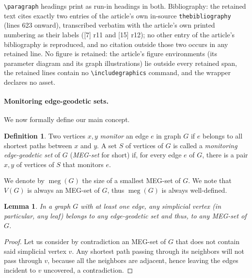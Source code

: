 \documentclass[10pt,a4paper]{amsart}
\theoremstyle{plain}
\newtheorem{lemma}[theorem]{Lemma}
\theoremstyle{definition}
\newtheorem{definition}[theorem]{Definition}
\DeclareMathOperator{\MEG}{meg}
\begin{document}
\texttt{\textbackslash paragraph} headings print as run-in headings in both. Bibliography: the retained text cites exactly two entries of the article's own in-source \texttt{thebibliography} (lines 623 onward), transcribed verbatim with the article's own printed numbering as their labels ([7] r11 and [15] r12); no other entry of the article's bibliography is reproduced, and no citation outside those two occurs in any retained line. No figure is retained: the article's figure environments (its parameter diagram and its graph illustrations) lie outside every retained span, the retained lines contain no \texttt{\textbackslash includegraphics} command, and the wrapper declares no asset.
\paragraph{Monitoring edge-geodetic sets.}
We now formally define our main concept. 

\begin{definition}
Two vertices $x,y$ \emph{monitor} an edge $e$ in graph $G$ if $e$ belongs to all shortest paths between $x$ and $y$. A set $S$ of vertices of $G$ is called a \emph{monitoring edge-geodetic set} of $G$ (\emph{MEG-set} for short) if, for every edge $e$ of $G$, there is a pair $x,y$ of vertices of $S$ that monitors $e$.
\end{definition}

We denote by $\MEG(G)$ the size of a smallest MEG-set of $G$. We note that $V(G)$ is always an MEG-set of $G$, thus $\MEG(G)$ is always well-defined.

\begin{lemma}\label{simplicial}\label{leaf-node}
In a graph $G$ with at least one edge, any simplicial vertex (in particular, any leaf) belongs to any edge-geodetic set and thus, to any MEG-set of $G$.
\end{lemma}
\begin{proof} Let us consider by contradiction an MEG-set of $G$ that does not contain said simplicial vertex $v$. Any shortest path passing through its neighbors will not pass through $v$, because all the neighbors are adjacent, hence leaving the edges incident to $v$ uncovered, a contradiction.
\end{proof}
\end{document}
